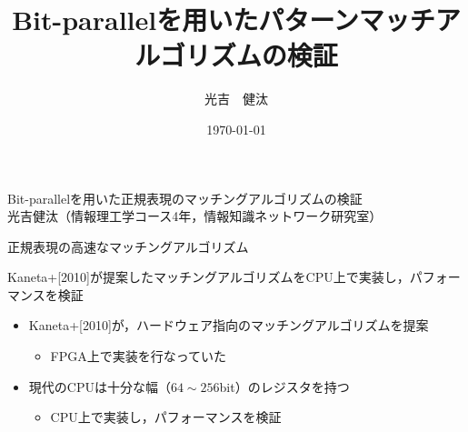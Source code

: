 \documentclass[dvipdfmx,12pt,notheorems]{beamer} %
\title[略タイトル]{Bit-parallelを用いたパターンマッチアルゴリズムの検証} %
\author[Mitsuyoshi]{光吉　健汰\inst{1}}
\institute[IKN]{\inst{1}北海道大学工学部 情報エレクトロニクス学科 情報理工学コース 4年\\
情報知識ネットワーク研究室}
\date{\today}%
\begin{document}
\begin{frame}{{\small Bit-parallelを用いた正規表現のマッチングアルゴリズムの検証}\\
		{\scriptsize 光吉健汰（情報理工学コース4年，情報知識ネットワーク研究室）}
	}
	\begin{description}[背景:]
		\item[背景:] 正規表現の高速なマッチングアルゴリズム
		\item[目的:] Kaneta+[2010]が提案したマッチングアルゴリズムをCPU上で実装し，パフォーマンスを検証
	\end{description}
	\begin{itemize}
		\item Kaneta+[2010]が，ハードウェア指向のマッチングアルゴリズムを提案
			\begin{itemize}
				\item FPGA上で実装を行なっていた
			\end{itemize}
		\item 現代のCPUは十分な幅（$64\sim256$bit）のレジスタを持つ
			\begin{itemize}
				\item CPU上で実装し，パフォーマンスを検証
			\end{itemize}
	\end{itemize} 
	
\end{frame}
\end{document}
